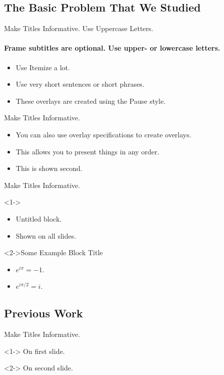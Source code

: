 \documentclass[english]{beamer}
\begin{document}
\subsection[Basic Problem]{The Basic Problem That We Studied}
\begin{frame}{Make Titles Informative. Use Uppercase Letters.}

\framesubtitle{Frame subtitles are optional. Use upper- or lowercase letters.}
\begin{itemize}
\item Use Itemize a lot.

\pause{}
\item Use very short sentences or short phrases.

\pause{}
\item These overlays are created using the Pause style.
\end{itemize}
\end{frame}
%
\begin{frame}{Make Titles Informative. }
\begin{itemize}
\item<1-> You can also use overlay specifications to create overlays.
\item<3-> This allows you to present things in any order.
\item<2-> This is shown second.
\end{itemize}
\end{frame}
%
\begin{frame}{Make Titles Informative.}
\begin{block}<1->{}
\begin{itemize}
\item Untitled block.
\item Shown on all slides.
\end{itemize}
\end{block}
\begin{exampleblock}<2->{Some Example Block Title}
\begin{itemize}
\item $e^{i\pi}=-1$.
\item $e^{i\pi/2}=i$.
\end{itemize}
\end{exampleblock}
\end{frame}

\subsection{Previous Work}
\begin{frame}{Make Titles Informative. }
\begin{example}<1->
On first slide. 
\end{example}

\begin{example}<2->
On second slide.
\end{example}

\end{frame}
\end{document}
